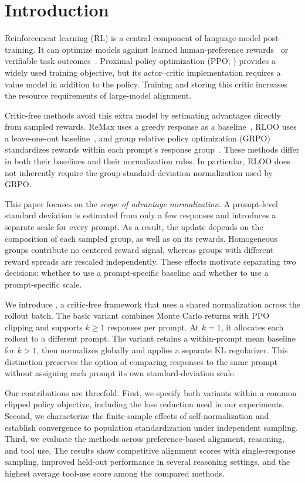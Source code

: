 \section{Introduction}
Reinforcement learning (RL) is a central component of language-model post-training. It can optimize models against learned human-preference rewards~\citep{Ouyang2022} or verifiable task outcomes~\citep{shao2024deepseekmath,guo2025deepseek}. Proximal policy optimization (PPO; \citealp{schulman2017proximal}) provides a widely used training objective, but its actor--critic implementation requires a value model in addition to the policy. Training and storing this critic increases the resource requirements of large-model alignment.

Critic-free methods avoid this extra model by estimating advantages directly from sampled rewards. ReMax uses a greedy response as a baseline~\citep{li2023remax}, RLOO uses a leave-one-out baseline~\citep{2024Back}, and group relative policy optimization (GRPO) standardizes rewards within each prompt's response group~\citep{shao2024deepseekmath}. These methods differ in both their baselines and their normalization rules. In particular, RLOO does not inherently require the group-standard-deviation normalization used by GRPO.

This paper focuses on the \emph{scope of advantage normalization}. A prompt-level standard deviation is estimated from only a few responses and introduces a separate scale for every prompt. As a result, the update depends on the composition of each sampled group, as well as on its rewards. Homogeneous groups contribute no centered reward signal, whereas groups with different reward spreads are rescaled independently. These effects motivate separating two decisions: whether to use a prompt-specific baseline and whether to use a prompt-specific scale.

We introduce \ours, a critic-free framework that uses a shared normalization across the rollout batch. The basic variant combines Monte Carlo returns with PPO clipping and supports $k\geq 1$ responses per prompt. At $k=1$, it allocates each rollout to a different prompt. The \baseline variant retains a within-prompt mean baseline for $k>1$, then normalizes globally and applies a separate KL regularizer. This distinction preserves the option of comparing responses to the same prompt without assigning each prompt its own standard-deviation scale.

Our contributions are threefold. First, we specify both variants within a common clipped policy objective, including the loss reduction used in our experiments. Second, we characterize the finite-sample effects of self-normalization and establish convergence to population standardization under independent sampling. Third, we evaluate the methods across preference-based alignment, reasoning, and tool use. The results show competitive alignment scores with single-response sampling, improved held-out performance in several reasoning settings, and the highest average tool-use score among the compared methods.
